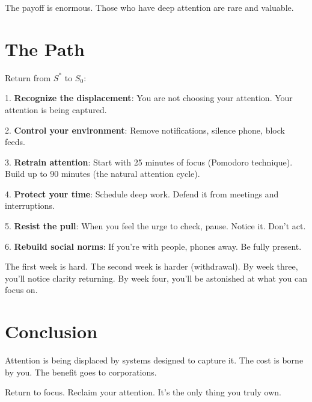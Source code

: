 \documentclass[12pt]{article}
\begin{document}
The payoff is enormous. Those who have deep attention are rare and valuable.

\section{The Path}

Return from $S^*$ to $S_0$:

1. \textbf{Recognize the displacement}: You are not choosing your attention. Your attention is being captured.

2. \textbf{Control your environment}: Remove notifications, silence phone, block feeds.

3. \textbf{Retrain attention}: Start with 25 minutes of focus (Pomodoro technique). Build up to 90 minutes (the natural attention cycle).

4. \textbf{Protect your time}: Schedule deep work. Defend it from meetings and interruptions.

5. \textbf{Resist the pull}: When you feel the urge to check, pause. Notice it. Don't act.

6. \textbf{Rebuild social norms}: If you're with people, phones away. Be fully present.

The first week is hard. The second week is harder (withdrawal). By week three, you'll notice clarity returning. By week four, you'll be astonished at what you can focus on.

\section{Conclusion}

Attention is being displaced by systems designed to capture it. The cost is borne by you. The benefit goes to corporations.

Return to focus. Reclaim your attention. It's the only thing you truly own.
\end{document}
